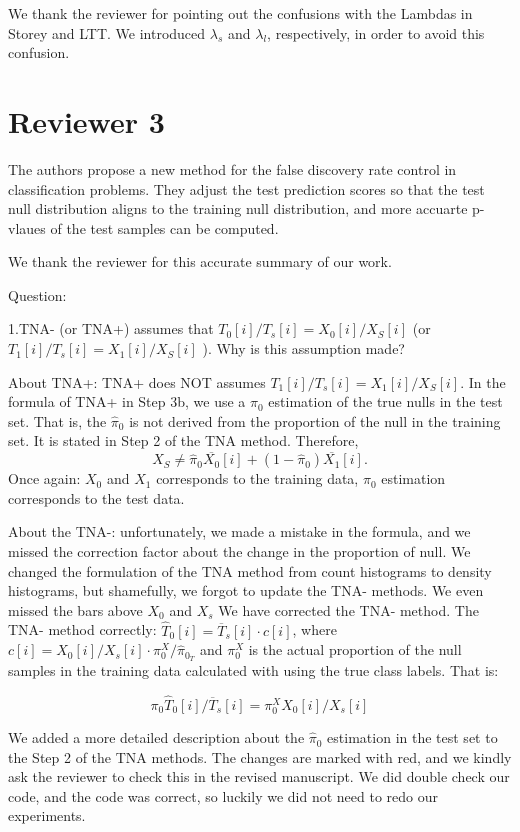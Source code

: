 \documentclass{article}
\newcommand{\response}[1]{\vspace*{1ex} \color{blue} \noindent #1 \color{black}
\vspace*{2ex}}
\begin{document}
\response{We thank the reviewer for pointing out the confusions with the Lambdas in Storey and LTT. We introduced $\lambda_s$ and $\lambda_l$, respectively, in order to avoid this confusion.}

\clearpage

\section*{Reviewer 3}

The authors propose a new method for the false discovery rate control in classification problems. They adjust the test prediction scores so that the test null distribution
aligns to the training null distribution, and more accuarte p-vlaues of the test samples can be computed.

\response{We thank the reviewer for this accurate summary of our work.}

Question:

1.TNA- (or TNA+) assumes that $T_0[i]/T_s[i]= X_0[i]/X_S[i]$ (or $T_1[i]/T_s[i]= X_1[i]/X_S[i]$ ). Why is this assumption made? 

\response{About TNA+: TNA+ does NOT assumes $T_1[i]/T_s[i]= X_1[i]/X_S[i]$. In the formula of TNA+ in Step 3b, we use a $\pi_0$ estimation of the true nulls in the test set. That is, the $\hat{\pi}_0$ is not derived from the proportion of the null in the training set. It is stated in Step 2 of the TNA method. Therefore,  $$X_S \ne  \hat{\pi}_0 \overline{X_0}[i] + (1-\hat{\pi}_0) \overline{X_1}[i].$$ 
Once again: $X_0$ and $X_1$ corresponds to the training data, $\pi_0$ estimation corresponds to the test data.
	
	
About the TNA-: unfortunately, we made a mistake in the formula, and we missed the correction factor about the change in the proportion of null. We changed the formulation of the TNA method from count histograms to density histograms,  but shamefully, we forgot to update the TNA- methods. We even missed the bars above $X_0$ and $X_s$ We have corrected the TNA- method. The TNA- method correctly: $\hat{T}_0[i] = \overline{T}_s[i]\cdot c[i]$, where  $c[i]=X_0[i]/X_s[i]\cdot \pi^{X}_{0}/\hat{\pi}_{0_T}$ and $\pi^{X}_{0}$ is the actual proportion of the null samples in the training data calculated with using the true class labels. That is:

$$\pi_0\hat{T}_0[i] /\overline{T}_s[i]= \pi^{X}_{0} X_0[i]/X_s[i]$$

We added a more detailed description about the  $\hat{\pi}_0$ estimation in the test set to the Step 2 of the TNA methods. The changes are marked with red, and we kindly ask the reviewer to check this in the revised manuscript. We did double check our code, and the code was correct, so luckily we did not need to redo our experiments.}
\end{document}
